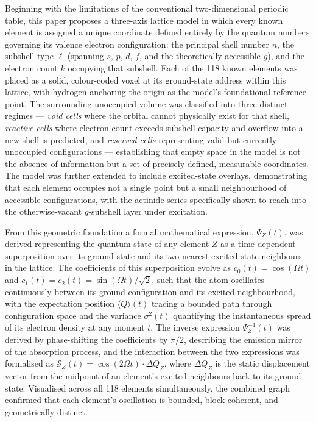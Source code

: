 \documentclass[12pt, a4paper]{article}
\newcommand{\Int}{\mathcal{S}}           %
\newcommand{\PsiF}{\Psi_{Z}}            %
\newcommand{\PsiI}{\Psi_{Z}^{-1}}       %
\newcommand{\DQ}{\Delta Q_{Z}}          %
\begin{document}
Beginning with the limitations of the conventional two-dimensional periodic table, this paper
proposes a three-axis lattice model in which every known element is assigned a unique
coordinate defined entirely by the quantum numbers governing its valence electron
configuration: the principal shell number $n$, the subshell type $\ell$
(spanning $s$, $p$, $d$, $f$, and the theoretically accessible $g$), and the electron count
$k$ occupying that subshell. Each of the 118 known elements was placed as a solid,
colour-coded voxel at its ground-state address within this lattice, with hydrogen anchoring the
origin as the model's foundational reference point. The surrounding unoccupied volume was
classified into three distinct regimes --- \textit{void cells} where the orbital cannot physically
exist for that shell, \textit{reactive cells} where electron count exceeds subshell capacity and
overflow into a new shell is predicted, and \textit{reserved cells} representing valid but
currently unoccupied configurations --- establishing that empty space in the model is not the
absence of information but a set of precisely defined, measurable coordinates. The model
was further extended to include excited-state overlays, demonstrating that each element
occupies not a single point but a small neighbourhood of accessible configurations, with the
actinide series specifically shown to reach into the otherwise-vacant $g$-subshell layer under
excitation.

From this geometric foundation a formal mathematical expression, $\PsiF(t)$, was derived
representing the quantum state of any element $Z$ as a time-dependent superposition over
its ground state and its two nearest excited-state neighbours in the lattice. The coefficients of
this superposition evolve as $c_0(t) = \cos(\Omega t)$ and
$c_1(t) = c_2(t) = \sin(\Omega t)/\sqrt{2}$, such that the atom oscillates continuously
between its ground configuration and its excited neighbourhood, with the expectation
position $\langle Q \rangle(t)$ tracing a bounded path through configuration space and the
variance $\sigma^2(t)$ quantifying the instantaneous spread of its electron density at any
moment $t$. The inverse expression $\PsiI(t)$ was derived by phase-shifting the
coefficients by $\pi/2$, describing the emission mirror of the absorption process, and the
interaction between the two expressions was formalised as
$\Int_Z(t) = \cos(2\Omega t)\cdot\DQ$, where $\DQ$ is the static displacement vector from
the midpoint of an element's excited neighbours back to its ground state. Visualised across
all 118 elements simultaneously, the combined graph confirmed that each element's
oscillation is bounded, block-coherent, and geometrically distinct.
\end{document}

